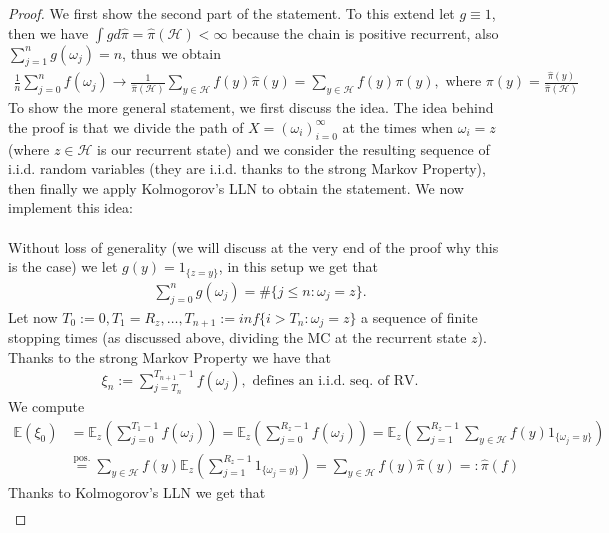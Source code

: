\documentclass[11pt,a4paper, final]{article}
\theoremstyle{definition}
\begin{document}
\begin{proof}
We first show the second part of the statement. To this extend let $g \equiv 1$, then we have $\int g d \hat{\pi}= \hat{\pi}( \mathcal{H})< \infty$ because the chain is positive recurrent, also $\sum_{j=1}^n g( \omega_j) = n$, thus we obtain 
\begin{align*}
\frac{1}{n} \sum_{j=0}^n f( \omega_j) \to \frac{1}{\hat{\pi}(\mathcal{H})}  \sum_{y \in \mathcal{H}} f(y) \hat{\pi}(y) = \sum_{y \in \mathcal{H}} f(y) \pi(y), \text{ where } \pi(y) = \frac{\hat{\pi}(y)}{\hat{\pi}(\mathcal{H})}
\end{align*}
To show the more general statement, we first discuss the idea. The idea behind the proof is that we divide the path of $X=( \omega_i)_{i=0}^\infty$ at the times when $\omega_i=z$ (where $z \in \mathcal{H}$ is our recurrent state) and we consider the resulting sequence of i.i.d. random variables (they are i.i.d. thanks to the strong Markov Property), then finally we apply Kolmogorov's LLN to obtain the statement. We now implement this idea:
\\\\
Without loss of generality (we will discuss at the very end of the proof why this is the case) we let $g(y)= 1_{ \lbrace z=y \rbrace}$, in this setup we get that 
\begin{align*}
\sum_{j=0}^n g( \omega_j)= \# \lbrace j \leq n : \omega_j = z \rbrace.
\end{align*}
Let now $T_0:=0, T_1= R_z, \dots , T_{n+1}:= inf \lbrace i > T_n : \omega_j = z \rbrace$ a sequence of finite stopping times (as discussed above, dividing the MC at the recurrent state $z$). Thanks to the strong Markov Property we have that \begin{align*}
\xi_n := \sum_{j= T_n}^{T_{n+1}-1} f( \omega_j), \text{ defines an i.i.d. seq. of RV}.
\end{align*}
We compute
\begin{align*}
\mathbb{E}( \xi_0)&= \mathbb{E}_z \left( \sum_{j=0}^{T_1-1} f( \omega_j) \right) = \mathbb{E}_z \left( \sum_{j=0}^{R_z-1} f( \omega_j) \right) 
 = \mathbb{E}_z \left( \sum_{j=1}^{R_z-1} \sum_{y \in \mathcal{H}} f(y) 1_{ \lbrace \omega_j = y \rbrace} \right) \\ & \overset{\text{pos.}}= \sum_{y \in \mathcal{H}} f(y) \mathbb{E}_z \left( \sum_{j=1}^{R_z-1} 1_{ \lbrace \omega_j =y \rbrace} \right)  
 = \sum_{y \in \mathcal{H}} f(y) \hat{\pi}(y) =: \hat{\pi}(f)
\end{align*}
\newpage
Thanks to Kolmogorov's LLN we get that \begin{align*}

\end{align*}
\end{proof}
\end{document}
